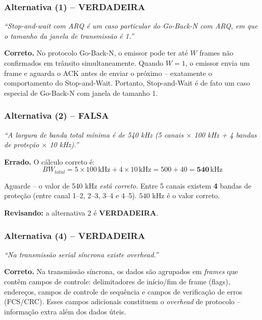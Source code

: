 \documentclass[12pt,a4paper]{article}
\begin{document}
\vspace{0.5em}

\subsubsection*{Alternativa (1) -- \textcolor{green!50!black}{\textbf{VERDADEIRA}}}

\textit{``Stop-and-wait com ARQ é um caso particular do Go-Back-N com ARQ, em que o tamanho da janela de transmissão é 1.''}

\textbf{Correto.} No protocolo Go-Back-N, o emissor pode ter até $W$ frames não confirmados em trânsito simultaneamente. Quando $W = 1$, o emissor envia um frame e aguarda o ACK antes de enviar o próximo -- exatamente o comportamento do Stop-and-Wait. Portanto, Stop-and-Wait é de fato um caso especial de Go-Back-N com janela de tamanho 1.

\subsubsection*{Alternativa (2) -- \textcolor{red!70!black}{\textbf{FALSA}}}

\textit{``A largura de banda total mínima é de 540 kHz (5 canais $\times$ 100 kHz + 4 bandas de proteção $\times$ 10 kHz).''}

\textbf{Errado.} O cálculo correto é:
\[
    BW_{total} = 5 \times 100\,\text{kHz} + 4 \times 10\,\text{kHz} = 500 + 40 = \mathbf{540}\,\text{kHz}
\]

Aguarde -- o valor de 540 kHz \textit{está correto}. Entre 5 canais existem \textbf{4} bandas de proteção (entre canal 1--2, 2--3, 3--4 e 4--5). $540$ kHz é o valor correto.

\textbf{Revisando:} a alternativa 2 é \textcolor{green!50!black}{\textbf{VERDADEIRA}}.

\subsubsection*{Alternativa (4) -- \textcolor{green!50!black}{\textbf{VERDADEIRA}}}

\textit{``Na transmissão serial síncrona existe overhead.''}

\textbf{Correto.} Na transmissão síncrona, os dados são agrupados em \textit{frames} que contêm campos de controle: delimitadores de início/fim de frame (flags), endereços, campos de controle de sequência e campos de verificação de erros (FCS/CRC). Esses campos adicionais constituem o \textit{overhead} de protocolo -- informação extra além dos dados úteis.
\end{document}
